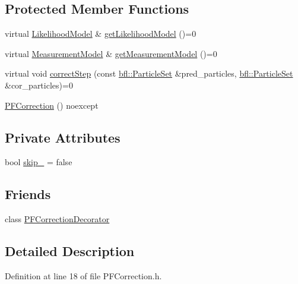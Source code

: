 \subsection*{Protected Member Functions}
\begin{DoxyCompactItemize}
\item 
virtual \mbox{\hyperlink{classbfl_1_1LikelihoodModel}{Likelihood\+Model}} \& \mbox{\hyperlink{classbfl_1_1PFCorrection_ad812d0b488e0882b246dd19d4f6818e1}{get\+Likelihood\+Model}} ()=0
\item 
virtual \mbox{\hyperlink{classbfl_1_1MeasurementModel}{Measurement\+Model}} \& \mbox{\hyperlink{classbfl_1_1PFCorrection_a891c7d498caffb4d11e5ebdaa475c683}{get\+Measurement\+Model}} ()=0
\item 
virtual void \mbox{\hyperlink{classbfl_1_1PFCorrection_ae0413156a1258d88485e57a983c89af1}{correct\+Step}} (const \mbox{\hyperlink{classbfl_1_1ParticleSet}{bfl\+::\+Particle\+Set}} \&pred\+\_\+particles, \mbox{\hyperlink{classbfl_1_1ParticleSet}{bfl\+::\+Particle\+Set}} \&cor\+\_\+particles)=0
\item 
\mbox{\hyperlink{classbfl_1_1PFCorrection_ae4be8c44771f209d79c549305cb63dcf}{P\+F\+Correction}} () noexcept
\end{DoxyCompactItemize}
\subsection*{Private Attributes}
\begin{DoxyCompactItemize}
\item 
bool \mbox{\hyperlink{classbfl_1_1PFCorrection_aac7b1063a3207bd00547ad5490bbc935}{skip\+\_\+}} = false
\end{DoxyCompactItemize}
\subsection*{Friends}
\begin{DoxyCompactItemize}
\item 
class \mbox{\hyperlink{classbfl_1_1PFCorrection_a58497dd469f7041f127774bccdc78022}{P\+F\+Correction\+Decorator}}
\end{DoxyCompactItemize}


\subsection{Detailed Description}


Definition at line 18 of file P\+F\+Correction.\+h.



